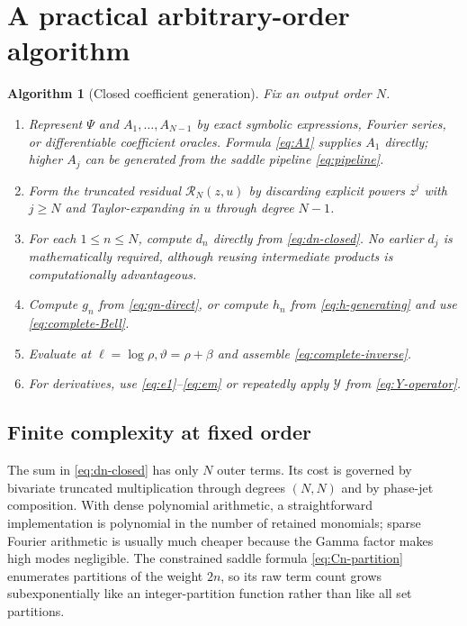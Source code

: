 \documentclass[11pt,oneside]{article}
\numberwithin{equation}{section}
\newtheorem{algorithm}[theorem]{Algorithm}
\theoremstyle{definition}
\theoremstyle{remark}
\newcommand{\phase}{\vartheta}
\begin{document}
\section{A practical arbitrary-order algorithm}
\label{sec:algorithm}

\begin{algorithm}[Closed coefficient generation]
\label{alg:coefficients}
Fix an output order $N$.

\begin{enumerate}
\item Represent $\Psi$ and $A_1,\ldots,A_{N-1}$ by exact symbolic expressions,
Fourier series, or differentiable coefficient oracles.  Formula
\eqref{eq:A1} supplies $A_1$ directly; higher $A_j$ can be generated from the
saddle pipeline \eqref{eq:pipeline}.

\item Form the truncated residual $\mathcal R_N(z,u)$ by discarding explicit
powers $z^j$ with $j\ge N$ and Taylor-expanding in $u$ through degree $N-1$.

\item For each $1\le n\le N$, compute $d_n$ directly from
\eqref{eq:dn-closed}.  No earlier $d_j$ is mathematically required, although
reusing intermediate products is computationally advantageous.

\item Compute $g_n$ from \eqref{eq:gn-direct}, or compute $h_n$ from
\eqref{eq:h-generating} and use \eqref{eq:complete-Bell}.

\item Evaluate at
\(
\ell=\log\rho,
\phase=\rho+\beta
\)
and assemble \eqref{eq:complete-inverse}.

\item For derivatives, use \eqref{eq:e1}--\eqref{eq:em} or repeatedly apply
$\mathscr Y$ from \eqref{eq:Y-operator}.
\end{enumerate}
\end{algorithm}

\subsection{Finite complexity at fixed order}

The sum in \eqref{eq:dn-closed} has only $N$ outer terms.  Its cost is governed
by bivariate truncated multiplication through degrees $(N,N)$ and by phase-jet
composition.  With dense polynomial arithmetic, a straightforward
implementation is polynomial in the number of retained monomials; sparse
Fourier arithmetic is usually much cheaper because the Gamma factor makes
high modes negligible.  The constrained saddle formula
\eqref{eq:Cn-partition} enumerates partitions of the weight $2n$, so its raw
term count grows subexponentially like an integer-partition function rather
than like all set partitions.
\end{document}
